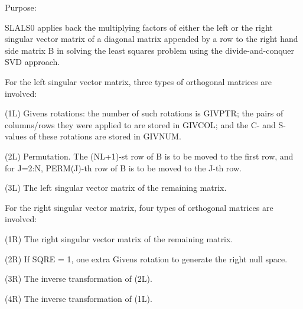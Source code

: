  \begin{DoxyParagraph}{Purpose\+: }
\begin{DoxyVerb} SLALS0 applies back the multiplying factors of either the left or the
 right singular vector matrix of a diagonal matrix appended by a row
 to the right hand side matrix B in solving the least squares problem
 using the divide-and-conquer SVD approach.

 For the left singular vector matrix, three types of orthogonal
 matrices are involved:

 (1L) Givens rotations: the number of such rotations is GIVPTR; the
      pairs of columns/rows they were applied to are stored in GIVCOL;
      and the C- and S-values of these rotations are stored in GIVNUM.

 (2L) Permutation. The (NL+1)-st row of B is to be moved to the first
      row, and for J=2:N, PERM(J)-th row of B is to be moved to the
      J-th row.

 (3L) The left singular vector matrix of the remaining matrix.

 For the right singular vector matrix, four types of orthogonal
 matrices are involved:

 (1R) The right singular vector matrix of the remaining matrix.

 (2R) If SQRE = 1, one extra Givens rotation to generate the right
      null space.

 (3R) The inverse transformation of (2L).

 (4R) The inverse transformation of (1L).\end{DoxyVerb}
 
\end{DoxyParagraph}

